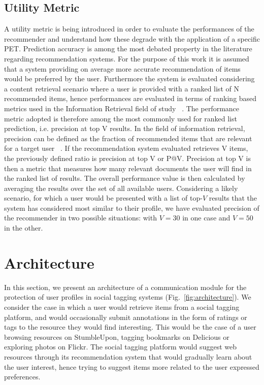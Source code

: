 \subsection{Utility Metric}
\noindent
A utility metric is being introduced in order to evaluate the performances of the recommender and understand how these degrade with the application of a specific PET.
Prediction accuracy is among the most debated property in the literature regarding recommendation systems. For the purpose of this work it is assumed that a system providing on average more accurate recommendation of items would be preferred by the user. Furthermore the system is evaluated considering a content retrieval scenario where a user is provided with a ranked list of N recommended items, hence performances are evaluated in terms of ranking based metrics used in the Information Retrieval field of study~\cite{a16} .
The performance metric adopted is therefore among the most commonly used for ranked list prediction, i.e. precision at top V results. In the field of information retrieval, precision can be defined as the fraction of recommended items that are relevant for a target user~\cite{a17} . If the recommendation system evaluated retrieves V items, the previously defined ratio is precision at top V or P@V. Precision at top V is then a metric that measures how many relevant documents the user will find in the ranked list of results.
The overall performance value is then calculated by averaging the results over the set of all available users.
Considering a likely scenario, for which a user would be presented with a list of top-$V$ results that the system has considered most similar to their profile, we have evaluated precision of the recommender in two possible situations: with $V=30$ in one case and $V=50$ in the other.

\section{Architecture}
\label{sec:architecture}
In this section, we present an architecture of a communication module for the protection of user profiles in social tagging systems (Fig.~\ref{fig:architecture}). We consider the case in which a user would retrieve items from a social tagging platform, and would occasionally submit annotations in the form of ratings or tags to the resource they would find interesting. This would be the case of a user browsing resources on StumbleUpon, tagging bookmarks on Delicious or exploring photos on Flickr. The social tagging platform would suggest web resources through its recommendation system that would gradually learn about the user interest, hence trying to suggest items more related to the user expressed preferences.

